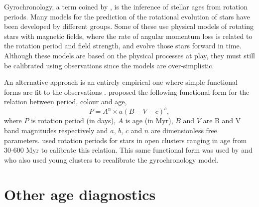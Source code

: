 Gyrochronology, a term coined by \citet{Barnes2003}, is the inference of
stellar ages from rotation periods.
Many models for the prediction of the rotational evolution of stars have been
developed by different groups.
Some of these \citep[\eg][]{Vansaders, Reiners2012, Brown} use physical models
of rotating stars with magnetic fields, where the rate of angular momentum
loss is related to the rotation period and field strength, and evolve those
stars forward in time.
Although these models are based on the physical processes at play, they must
still be calibrated using observations since the models are over-simplistic.

An alternative approach is an entirely empirical one where simple functional
forms are fit to the observations \citep[\eg][]{Barnes2007, Mamajek2008,
Meibom2010}.
\citet{Barnes2003} proposed the following functional form for the relation
between period, colour and age, \begin{equation} \label{eq:Barnes2007_2} P =
A^n \times a(B-V-c)^b, \end{equation} where $P$ is rotation period (in days),
$A$ is age (in Myr), $B$ and $V$ are B and V band magnitudes respectively and
$a$, $b$, $c$ and $n$ are dimensionless free parameters.
\citet{Barnes2007} used rotation periods for stars in open clusters ranging in
age from 30-600 Myr to calibrate this relation.
This same functional form was used by \citet{Mamajek2008} and
\citet{Meibom2010} who also used young clusters to recalibrate the
gyrochronology model.

\section{Other age diagnostics}

